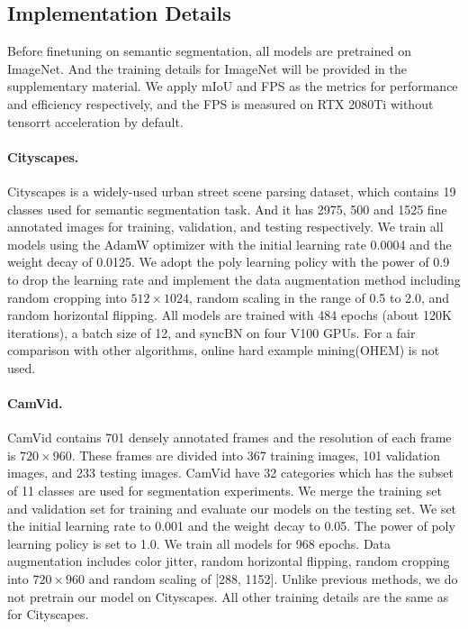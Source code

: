 \documentclass{article}
\begin{document}
\subsection{Implementation Details}
Before finetuning on semantic segmentation, all models are pretrained on ImageNet\cite{deng2009imagenet}. And the training details for ImageNet\cite{deng2009imagenet} will be provided in the supplementary material. We apply mIoU and FPS as the metrics for performance and efficiency respectively, and the FPS is measured on RTX 2080Ti without tensorrt acceleration by default.

\vspace{-2mm}
\paragraph{Cityscapes.}
Cityscapes\cite{Cityscapes} is a widely-used urban street scene parsing dataset, which contains 19 classes used for semantic segmentation task. And it has 2975, 500 and 1525 fine annotated images for training, validation, and testing respectively. We train all models using the AdamW optimizer with the initial learning rate 0.0004 and the weight decay of 0.0125. We adopt the poly learning policy with the power of 0.9 to drop the learning rate and implement the data augmentation method including random cropping into $512\times1024$, random scaling in the range of 0.5 to 2.0, and random horizontal flipping. All models are trained with 484 epochs (about 120K iterations), a batch size of 12, and syncBN on four V100 GPUs. For a fair comparison with other algorithms, online hard example mining(OHEM) is not used.

\vspace{-2mm}
\paragraph{CamVid.}
CamVid\cite{CamVid} contains 701 densely annotated frames and the resolution of each frame is $720\times960$. These frames are divided into 367 training images, 101 validation images, and 233 testing images. CamVid\cite{CamVid} have 32 categories which has the subset of 11 classes are used for segmentation experiments.
We merge the training set and validation set for training and evaluate our models on the testing set. We set the initial learning rate to 0.001 and the weight decay to 0.05. The power of poly learning policy is set to 1.0. We train all models for 968 epochs. Data augmentation includes color jitter, random horizontal flipping, random cropping into $720\times960$ and random scaling of [288, 1152]. Unlike previous methods\cite{fan2021rethinking}, we do not pretrain our model on Cityscapes\cite{Cityscapes}. All other training details are the same as for Cityscapes\cite{Cityscapes}.
\end{document}
